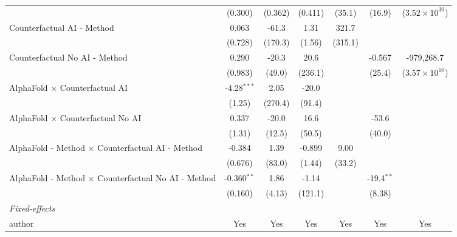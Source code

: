 \begin{tabular}{lcccccc}
                                                              & (0.300)       & (0.362)     & (0.411)     & (35.1)        & (16.9)       & ($3.52\times 10^{30}$)\\    
   Counterfactual AI - Method                                 & 0.063         & -61.3       & 1.31        & 321.7         &              &   \\   
                                                              & (0.728)       & (170.3)     & (1.56)      & (315.1)       &              &   \\   
   Counterfactual No AI - Method                              & 0.290         & -20.3       & 20.6        &               & -0.567       & -979,268.7\\   
                                                              & (0.983)       & (49.0)      & (236.1)     &               & (25.4)       & ($3.57\times 10^{10}$)\\    
   AlphaFold $\times$ Counterfactual AI                       & -4.28$^{***}$ & 2.05        & -20.0       &               &              &   \\   
                                                              & (1.25)        & (270.4)     & (91.4)      &               &              &   \\   
   AlphaFold $\times$ Counterfactual No AI                    & 0.337         & -20.0       & 16.6        &               & -53.6        &   \\   
                                                              & (1.31)        & (12.5)      & (50.5)      &               & (40.0)       &   \\   
   AlphaFold - Method $\times$ Counterfactual AI - Method     & -0.384        & 1.39        & -0.899      & 9.00          &              &   \\   
                                                              & (0.676)       & (83.0)      & (1.44)      & (33.2)        &              &   \\   
   AlphaFold - Method $\times$ Counterfactual No AI - Method  & -0.360$^{**}$ & 1.86        & -1.14       &               & -19.4$^{**}$ &   \\   
                                                              & (0.160)       & (4.13)      & (121.1)     &               & (8.38)       &   \\   
   \midrule
   \emph{Fixed-effects}\\
   author                                                     & Yes           & Yes         & Yes         & Yes           & Yes          & Yes\\  

\end{tabular}
